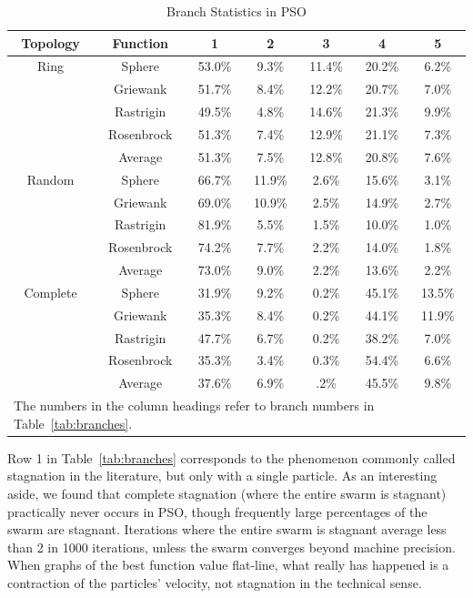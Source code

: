 \documentclass[journal,letterpaper]{IEEEtran}
\begin{document}
\begin{table}[ht]
  \caption{Branch Statistics in PSO}
  \label{tab:stats}
  \centering
  \begin{tabular}{c|c|c|c|c|c|c}
	Topology&Function&1&2&3&4&5\\
	\hline
	\hline
	Ring&Sphere&53.0\%&9.3\%&11.4\%&20.2\%&6.2\%\\
	&Griewank&51.7\%&8.4\%&12.2\%&20.7\%&7.0\%\\
	&Rastrigin&49.5\%&4.8\%&14.6\%&21.3\%&9.9\%\\
	&Rosenbrock&51.3\%&7.4\%&12.9\%&21.1\%&7.3\%\\
	\cline{2-7}
	&Average&{51.3\%}&{7.5\%}&{12.8\%}&{20.8\%}&
	{7.6\%}\\
	\hline
	\hline
	Random&Sphere&66.7\%&11.9\%&2.6\%&15.6\%&3.1\%\\
	&Griewank&69.0\%&10.9\%&2.5\%&14.9\%&2.7\%\\
	&Rastrigin&81.9\%&5.5\%&1.5\%&10.0\%&1.0\%\\
	&Rosenbrock&74.2\%&7.7\%&2.2\%&14.0\%&1.8\%\\
	\cline{2-7}
	&Average&{73.0\%}&{9.0\%}&{2.2\%}&{13.6\%}&
	{2.2\%}\\
	\hline
	\hline
	Complete&Sphere&31.9\%&9.2\%&0.2\%&45.1\%&13.5\%\\
	&Griewank&35.3\%&8.4\%&0.2\%&44.1\%&11.9\%\\
	&Rastrigin&47.7\%&6.7\%&0.2\%&38.2\%&7.0\%\\
	&Rosenbrock&35.3\%&3.4\%&0.3\%&54.4\%&6.6\%\\
	\cline{2-7}
	&Average&{37.6\%}&{6.9\%}&{.2\%}&{45.5\%}&
	{9.8\%}\\
	\hline
	\multicolumn{7}{l}{The numbers in the column headings refer to branch
	numbers in Table~\ref{tab:branches}.}
  \end{tabular}
\end{table}

Row 1 in Table~\ref{tab:branches} corresponds to the phenomenon commonly called
stagnation in the literature, but only with a single particle.  As an
interesting aside, we found that complete stagnation (where the entire swarm is
stagnant) practically never occurs in PSO, though frequently large percentages
of the swarm are stagnant.  Iterations where the entire swarm is stagnant
average less than 2 in 1000 iterations, unless the swarm converges beyond
machine precision.  When graphs of the best function value flat-line, what
really has happened is a contraction of the particles' velocity, not stagnation
in the technical sense.  
\end{document}
